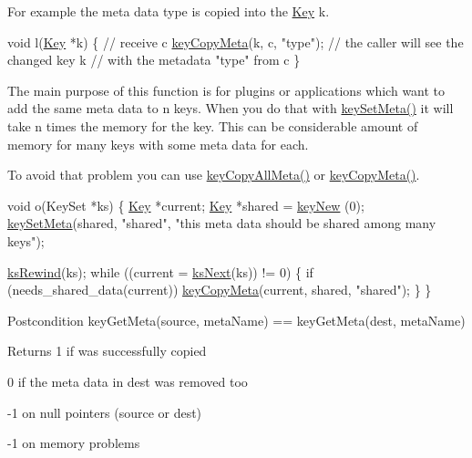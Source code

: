 For example the meta data type is copied into the \hyperlink{classkdb_1_1Key}{Key} k.


\begin{DoxyCode}
\textcolor{keywordtype}{void} l(\hyperlink{classkdb_1_1Key_a5679f5cae63caddd64a60388b9cc77fa}{Key} *k)
\{
        \textcolor{comment}{// receive c}
        \hyperlink{group__keymeta_ga9a22b992478e613c8788bd460b4a1f0c}{keyCopyMeta}(k, c, \textcolor{stringliteral}{"type"});
        \textcolor{comment}{// the caller will see the changed key k}
        \textcolor{comment}{// with the metadata "type" from c}
\}
\end{DoxyCode}


The main purpose of this function is for plugins or applications which want to add the same meta data to n keys. When you do that with \hyperlink{group__keymeta_gae1f15546b234ffb6007d8a31178652b9}{key\-Set\-Meta()} it will take n times the memory for the key. This can be considerable amount of memory for many keys with some meta data for each.

To avoid that problem you can use \hyperlink{group__keymeta_ga8e63720a65610a29597494d0671f9401}{key\-Copy\-All\-Meta()} or \hyperlink{group__keymeta_ga9a22b992478e613c8788bd460b4a1f0c}{key\-Copy\-Meta()}.


\begin{DoxyCode}
\textcolor{keywordtype}{void} o(KeySet *ks)
\{
        \hyperlink{classkdb_1_1Key_a5679f5cae63caddd64a60388b9cc77fa}{Key} *current;
        \hyperlink{classkdb_1_1Key_a5679f5cae63caddd64a60388b9cc77fa}{Key} *shared = \hyperlink{group__key_gaf6893c038b3ebee90c73a9ea8356bebf}{keyNew} (0);
        \hyperlink{group__keymeta_gae1f15546b234ffb6007d8a31178652b9}{keySetMeta}(shared, \textcolor{stringliteral}{"shared"}, \textcolor{stringliteral}{"this meta data should be shared
       among many keys"});

        \hyperlink{group__keyset_gabe793ff51f1728e3429c84a8a9086b70}{ksRewind}(ks);
        \textcolor{keywordflow}{while} ((current = \hyperlink{group__keyset_ga317321c9065b5a4b3e33fe1c399bcec9}{ksNext}(ks)) != 0)
        \{
                \textcolor{keywordflow}{if} (needs\_shared\_data(current)) \hyperlink{group__keymeta_ga9a22b992478e613c8788bd460b4a1f0c}{keyCopyMeta}(current,
       shared, \textcolor{stringliteral}{"shared"});
        \}
\}
\end{DoxyCode}


\begin{DoxyPostcond}{Postcondition}
key\-Get\-Meta(source, meta\-Name) == key\-Get\-Meta(dest, meta\-Name)
\end{DoxyPostcond}
\begin{DoxyReturn}{Returns}
1 if was successfully copied 

0 if the meta data in dest was removed too 

-\/1 on null pointers (source or dest) 

-\/1 on memory problems 
\end{DoxyReturn}


